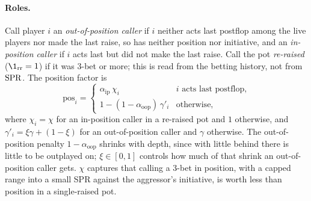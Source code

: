 \paragraph{Roles.} Call player $i$ an \emph{out-of-position caller} if $i$ neither acts last postflop among the live players nor made the last raise, so has neither position nor initiative, and an \emph{in-position caller} if $i$ acts last but did not make the last raise. Call the pot \emph{re-raised} ($\1_{\mathrm{rr}} = 1$) if it was 3-bet or more; this is read from the betting history, not from $\mathrm{SPR}$. The position factor is
\begin{equation}\label{eq:posfactor}
  \mathrm{pos}_i = \begin{cases} \alpha_{\mathrm{ip}}\,\chi_i & \text{$i$ acts last postflop,}\\ 1 - (1-\alpha_{\mathrm{oop}})\,\gamma'_i & \text{otherwise,}\end{cases}
\end{equation}
where $\chi_i = \chi$ for an in-position caller in a re-raised pot and $1$ otherwise, and $\gamma'_i = \xi\gamma + (1-\xi)$ for an out-of-position caller and $\gamma$ otherwise. The out-of-position penalty $1-\alpha_{\mathrm{oop}}$ shrinks with depth, since with little behind there is little to be outplayed on; $\xi \in [0,1]$ controls how much of that shrink an out-of-position caller gets. $\chi$ captures that calling a 3-bet in position, with a capped range into a small SPR against the aggressor's initiative, is worth less than position in a single-raised pot.

